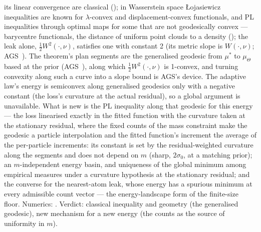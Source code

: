 \begin{itemize}
    its linear convergence are classical (\cite{S47}); in Wasserstein space {\L}ojasiewicz inequalities are known for
    $\lambda$-convex and displacement-convex functionals, and PL inequalities through optimal maps for some that are
    not geodesically convex --- barycentre functionals, the distance of uniform point clouds to a density
    (\cite{S48}); the leak alone, $\frac12W^2(\cdot,\nu)$, satisfies one with constant 2 (its metric slope is
    $W(\cdot,\nu)$; AGS~\cite[\S10.4]{ags2008}). The theorem's plan segments are the generalised geodesic from
    $\mu^*$ to $\mu_\Theta$ based at the prior (AGS~\cite[\S9.2]{ags2008}), along which $\frac12W^2(\cdot,\nu)$ is
    1-convex, and turning convexity along such a curve into a slope bound is AGS's device. The adaptive law's energy
    is semiconvex along generalised geodesics only with a negative constant (the loss's curvature at the actual
    residual), so a global argument is unavailable. What is new is the PL inequality along that geodesic for this
    energy --- the loss linearised exactly in the fitted function with the curvature taken at the stationary
    residual, where the fixed counts of the mass constraint make the geodesic a particle interpolation and the
    fitted function's increment the average of the per-particle increments: its constant is set by the
    residual-weighted curvature along the segments and does not depend on $m$ (sharp, $2\sigma_0$, at a matching
    prior); an $m$-independent energy basin, and uniqueness of the global minimum among empirical measures under a
    curvature hypothesis at the stationary residual; and the converse for the nearest-atom leak, whose energy has a
    spurious minimum at every admissible count vector --- the energy-landscape form of the finite-size floor.
    Numerics: . Verdict: classical inequality and geometry (the generalised geodesic), new
    mechanism for a new energy (the counts as the source of uniformity in $m$).

\end{itemize}
